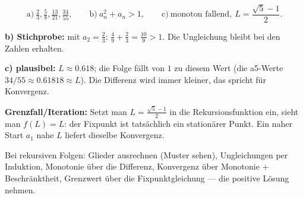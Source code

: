 \begin{ergebnis}
\begin{equation*}
  \text{a)}\ \tfrac23,\tfrac58,\tfrac{13}{21},\tfrac{34}{55},\qquad
  \text{b)}\ a_n^2+a_n>1,\qquad
  \text{c)}\ \text{monoton fallend},\ L=\frac{\sqrt5-1}2 .
\end{equation*}
\end{ergebnis}

\begin{kontrolle}
\textbf{b) Stichprobe:} mit $a_2=\frac23$: $\frac49+\frac23
=\frac{10}9>1$. Die Ungleichung bleibt bei den Zahlen erhalten.

\textbf{c) plausibel:} $L\approx0.618$; die Folge f\"allt von $1$ zu diesem
Wert (die a5-Werte $34/55\approx0.61818\approx L$). Die Differenz wird
immer kleiner, das spricht f\"ur Konvergenz.

\textbf{Grenzfall/Iteration:} Setzt man $L=\frac{\sqrt5-1}2$ in die
Rekursionsfunktion ein, sieht man $f(L)=L$: der Fixpunkt ist tats\"achlich
ein station\"arer Punkt. Ein naher Start $a_1$ nahe $L$ liefert dieselbe
Konvergenz.
\end{kontrolle}

\begin{merksatz}
Bei rekursiven Folgen: Glieder ausrechnen (Muster sehen), Ungleichungen
per Induktion, Monotonie \"uber die Differenz, Konvergenz \"uber Monotonie +
Beschr\"anktheit, Grenzwert \"uber die Fixpunktgleichung --- die positive
L\"osung nehmen.
\end{merksatz}
